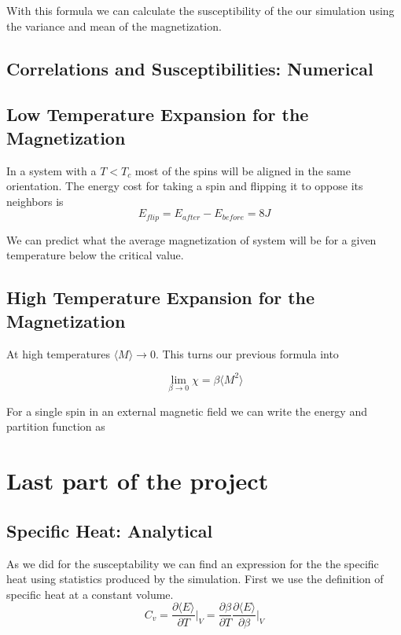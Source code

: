 \documentclass[a4paper,11pt]{article}
\begin{document}
        With this formula we can calculate the susceptibility of the our simulation using the variance and mean of the magnetization.


    \subsection{Correlations and Susceptibilities: Numerical}

    \subsection{Low Temperature Expansion for the Magnetization}
        In a system with a $T < T_c$ most of the spins will be aligned in the same orientation. The energy cost for taking a spin and flipping it to oppose its neighbors is
        \begin{equation}
            E_{flip} = E_{after} - E_{before} = 8J
        \end{equation}
        
        We can predict what the average magnetization of system will be for a given temperature below the critical value.

    \subsection{High Temperature Expansion for the Magnetization}
        At high temperatures $\langle M \rangle \rightarrow 0$. This turns our previous formula into

        \begin{equation}
            \lim_{\beta\to0} \chi = \beta \langle M^2 \rangle
        \end{equation}

        For a single spin in an external magnetic field we can write the energy and partition function as 

\section{Last part of the project}

    \subsection{Specific Heat: Analytical}
        As we did for the susceptability we can find an expression for the the specific heat using statistics produced by the simulation. First we use the definition of specific heat at a constant volume.
        \begin{equation}
            C_v = \frac{\partial{\langle E \rangle}}{\partial{T}}\bigg\vert_V = \frac{\partial\beta}{\partial T} \frac{\partial{\langle E \rangle}}{\partial{\beta}}\bigg\vert_V
        \end{equation}
\end{document}
